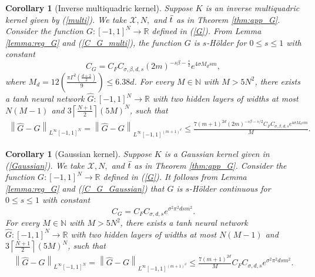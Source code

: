 \documentclass{article}
\def\NN{\mathbb N}
\def\RR{\mathbb R}
\numberwithin{equation}{section}
\newtheorem{corollary}[theorem]{Corollary}
\begin{document}
\begin{corollary}[Inverse multiquadric kernel] \label{G-Ghat_multi}
Suppose $K$ is an inverse multiquadric kernel given by (\ref{multi}). 
We take $\mathcal{X}, N,$ and $\Bar{t}$ as in Theorem \ref{thm:app_G}.
Consider the function $G:[-1,1]^N \rightarrow \RR$ defined in (\ref{G}). From Lemma \ref{lemma:reg_G} and (\ref{C_G_multi}), the function $G$ is $s$-H\"{o}lder for $0 \leq s \leq 1$ with constant $$C_G = C_FC_{\sigma, \beta,d,s}(2m)^{-s\beta -\frac{s}{2}}e^{4\sigma M_d sm},$$
where $M_d = 12 \left(\frac{\pi \Gamma^2(\frac{d+2}{2})}{9}\right) \leq 6.38d$.  For every $M\in \NN$ with $M>5N^2$, there exists a tanh neural network $\widehat{G}:[-1,1]^N \rightarrow \RR$ with two hidden layers of widths at most $N(M-1)$ and $3\left\lceil \frac{N+1}{2} \right\rceil (5M)^N$, such that 
\begin{eqnarray*}
    \left\|\widehat{G}-G\right\|_{L^\infty [-1,1]^N} =  \left\|\widehat{G}-G\right\|_{L^\infty [-1,1]^{(m+1)^{d}}} \leq \frac{7(m+1)^{2d}(2m)^{-s\beta-s/2}C_FC_{\sigma, \beta,d,s}e^{4\sigma M_d sm}}{M}. 
\end{eqnarray*}
\end{corollary}


\begin{corollary}[Gaussian kernel]\label{G-Ghat_Gaussian}
Suppose $K$ is a Gaussian kernel given in (\ref{Gaussian}). We take $\mathcal{X}, N,$ and $\Bar{t}$ as in Theorem \ref{thm:app_G}. 
Consider the function $G:[-1,1]^N \rightarrow \RR$ defined in (\ref{G}). 
It follows from Lemma \ref{lemma:reg_G} and (\ref{C_G_Gaussian}) that $G$ is $s$-H\"{o}lder continuous for $0 \leq s \leq 1$ with constant
$$ C_G = C_FC_{\sigma,d,s}e^{\sigma^2\pi^2 dsm^2}.$$
For every $M\in \NN$ with $M>5N^2$, there exists a tanh neural network $\widehat{G}:[-1,1]^N \rightarrow \RR$ with two hidden layers of widths at most $N(M-1)$ and $3\left\lceil \frac{N+1}{2} \right\rceil (5M)^N$, such that 
\begin{eqnarray*}
    \left\|\widehat{G}-G\right\|_{L^\infty [-1,1]^N} =  \left\|\widehat{G}-G\right\|_{L^\infty [-1,1]^{(m+1)^{d}}} 
    \leq \frac{7(m+1)^{2d}}{M} C_FC_{\sigma,d,s}e^{\sigma^2\pi^2 dsm^2}. 
\end{eqnarray*}
\end{corollary}



\end{document}
